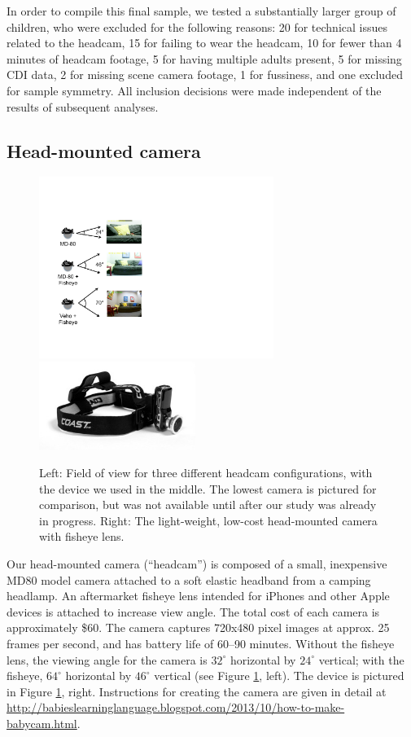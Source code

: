\documentclass[a4paper,man,apacite,floatsintext,longtable]{apa6}
\begin{document}
In order to compile this final sample, we tested a substantially larger
group of children, who were excluded for the following reasons: 20 for
technical issues related to the headcam, 15 for failing to wear the
headcam, 10 for fewer than 4 minutes of headcam footage, 5 for having
multiple adults present, 5 for missing CDI data, 2 for missing scene
camera footage, 1 for fussiness, and one excluded for sample symmetry.
All inclusion decisions were made independent of the results of
subsequent analyses.

\subsection{Head-mounted camera}\label{head-mounted-camera}

\begin{figure}
\centering
\includegraphics[width=3in]{images/viewangle.pdf}
\includegraphics[width=2in]{images/headcam_w_fisheye3.jpg}
\caption{\label{fig:headcam} Left: Field of view for three different headcam configurations, with the device we used in the middle. The lowest camera is pictured for comparison, but was not available until after our study was already in progress. Right: The light-weight, low-cost head-mounted camera with fisheye lens.}
\end{figure}

Our head-mounted camera (``headcam'') is composed of a small,
inexpensive MD80 model camera attached to a soft elastic headband from a
camping headlamp. An aftermarket fisheye lens intended for iPhones and
other Apple devices is attached to increase view angle. The total cost
of each camera is approximately \$60. The camera captures 720x480 pixel
images at approx. 25 frames per second, and has battery life of 60--90
minutes. Without the fisheye lens, the viewing angle for the camera is
\(32^{\circ}\) horizontal by \(24^{\circ}\) vertical; with the fisheye,
\(64^{\circ}\) horizontal by \(46^{\circ}\) vertical (see Figure
\ref{fig:headcam}, left). The device is pictured in Figure
\ref{fig:headcam}, right. Instructions for creating the camera are given
in detail at
\url{http://babieslearninglanguage.blogspot.com/2013/10/how-to-make-babycam.html}.
\end{document}
